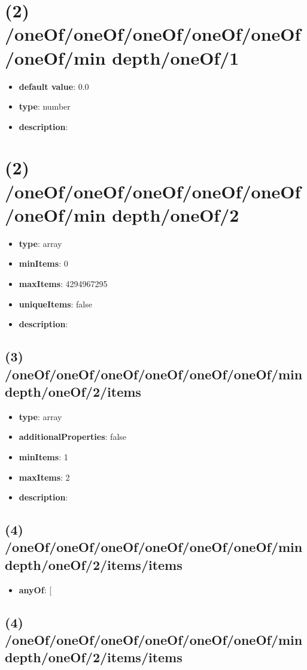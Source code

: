 \section{(2) /oneOf/oneOf/oneOf/oneOf/oneOf/oneOf/min depth/oneOf/1}
\begin{itemize}[leftmargin=2em]\item {\bf default value}: 0.0
\item {\bf type}: number
\item {\bf description}: 
\end{itemize}\section{(2) /oneOf/oneOf/oneOf/oneOf/oneOf/oneOf/min depth/oneOf/2}
\begin{itemize}[leftmargin=2em]\item {\bf type}: array
\item {\bf minItems}: 0
\item {\bf maxItems}: 4294967295
\item {\bf uniqueItems}: false
\item {\bf description}: 
\end{itemize}\subsection{(3) /oneOf/oneOf/oneOf/oneOf/oneOf/oneOf/min depth/oneOf/2/items}
\begin{itemize}[leftmargin=3em]\item {\bf type}: array
\item {\bf additionalProperties}: false
\item {\bf minItems}: 1
\item {\bf maxItems}: 2
\item {\bf description}: 
\end{itemize}\subsection{(4) /oneOf/oneOf/oneOf/oneOf/oneOf/oneOf/min depth/oneOf/2/items/items}
\begin{itemize}[leftmargin=4em]\item {\bf anyOf}: [\end{itemize}\subsection{(4) /oneOf/oneOf/oneOf/oneOf/oneOf/oneOf/min depth/oneOf/2/items/items}
